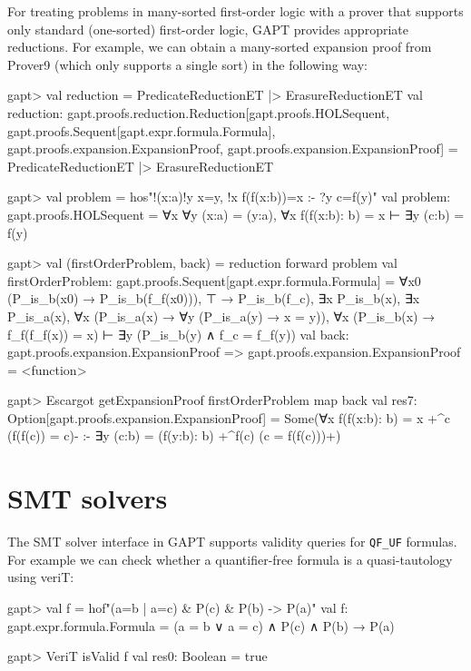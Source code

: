 \documentclass[a4paper,11pt]{book}
\begin{document}
For treating problems in many-sorted first-order logic with a prover that supports only
standard (one-sorted) first-order logic, GAPT provides appropriate reductions.
For example, we can obtain a many-sorted expansion proof from Prover9
(which only supports a single sort) in the following way:
\begin{clilisting}
gapt> val reduction = PredicateReductionET |> ErasureReductionET
val reduction:
  gapt.proofs.reduction.Reduction[gapt.proofs.HOLSequent,
    gapt.proofs.Sequent[gapt.expr.formula.Formula],
    gapt.proofs.expansion.ExpansionProof, gapt.proofs.expansion.ExpansionProof] = PredicateReductionET |> ErasureReductionET

gapt> val problem = hos"!(x:a)!y x=y, !x f(f(x:b))=x :- ?y c=f(y)"
val problem: gapt.proofs.HOLSequent = ∀x ∀y (x:a) = (y:a), ∀x f(f(x:b): b) = x ⊢ ∃y (c:b) = f(y)

gapt> val (firstOrderProblem, back) = reduction forward problem
val firstOrderProblem: gapt.proofs.Sequent[gapt.expr.formula.Formula] = ∀x0 (P_is_b(x0) → P_is_b(f_f(x0))),
⊤ → P_is_b(f_c),
∃x P_is_b(x),
∃x P_is_a(x),
∀x (P_is_a(x) → ∀y (P_is_a(y) → x = y)),
∀x (P_is_b(x) → f_f(f_f(x)) = x)
⊢
∃y (P_is_b(y) ∧ f_c = f_f(y))
val back: gapt.proofs.expansion.ExpansionProof =>
  gapt.proofs.expansion.ExpansionProof = <function>

gapt> Escargot getExpansionProof firstOrderProblem map back
val res7: Option[gapt.proofs.expansion.ExpansionProof] = Some(∀x f(f(x:b): b) = x +^{c} (f(f(c)) = c)-
:-
∃y (c:b) = (f(y:b): b) +^{f(c)} (c = f(f(c)))+)

\end{clilisting}

\section{SMT solvers}

The SMT solver interface in GAPT supports validity queries for \verb,QF_UF,
formulas.  For example we can check whether a quantifier-free formula is a
quasi-tautology using veriT:
\begin{clilisting}
gapt> val f = hof"(a=b | a=c) & P(c) & P(b) -> P(a)"
val f: gapt.expr.formula.Formula = (a = b ∨ a = c) ∧ P(c) ∧ P(b) → P(a)

\end{clilisting}

\begin{clilisting}
gapt> VeriT isValid f
  val res0: Boolean = true

\end{clilisting}
\end{document}
